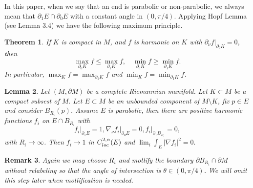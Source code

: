 \documentclass[12pt]{amsart}
\newcommand{\p}{\partial}
\newtheorem{theorem}{Theorem}[section]
\newtheorem{lemma}[theorem]{Lemma}
\newtheorem{remark}[theorem]{Remark}
\numberwithin{equation}{section}
\begin{document}
	In this paper, when we say that an end is parabolic or non-parabolic, we always mean that $\p_1 E\cap \p_0 E$ with a constant angle in $(0,\pi/4)$. Applying Hopf Lemma (see \cite{GilbaTrudi2001-EllipticPartialDifferential} Lemma 3.4) we have the following maximum principle.

	\begin{theorem}\label{MaxiP}
		If $K$ is compact in $M$, and $f$ is harmonic on $K$ with $\p_{\nu} f \vert_{\p_0 K}=0$, then
		\begin{equation*}
			\max_{\p_0 K} f \leq \max_{\p_1 K}f, \quad \min_{\p_0 K} f \geq \min_{\p_1 K} f.
		\end{equation*}
		In particular, $\max_{K} f=\max_{\p_1 K} f$ and $\min_{K} f=\min_{\p_1 K} f$.
	\end{theorem}

	

	\begin{lemma}\label{parabolic0energy}
		Let $(M,\partial M)$ be a complete Riemannian manifold. Let $K\subset M$ be a compact subsest of $M.$ Let $E\subset M$ be an unbounded component of $M\setminus K$, fix $p\in E$ and consider $B_{R_i}(p)$. Assume $E$ is parabolic, then there are positive harmonic functions $f_i$ on $E\cap B_{R_i}$ with 
		$$f_i\rvert_{\partial_1 E}=1, \nabla_{\nu}f_i\rvert_{\partial_0 E}=0,  f_i \rvert_{\partial_1 B_{R_i}}=0,$$
		with $R_i \rightarrow \infty$. Then $f_i \rightarrow 1$ in $C^{2,\alpha}_{\rm{loc}}(E)$ and $\lim_i \int_E |\nabla f_i|^2=0.$
	\end{lemma}

	\begin{remark}
		Again we may choose $R_i$ and mollify the boundary $\partial B_{R_i} \cap \partial M$ without relabeling so that the angle of intersection is $\theta \in (0,\pi/4)$. We will omit this step later when mollification is needed.
	\end{remark}
\end{document}
